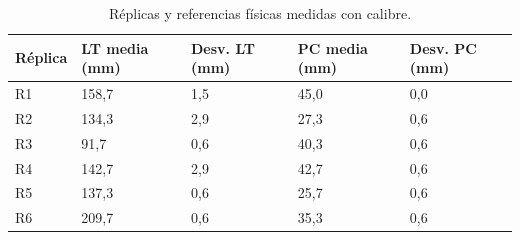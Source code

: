 
\begin{table}[htbp]
\centering\footnotesize
\caption{Réplicas y referencias físicas medidas con calibre.}
\label{tab:replicas}
\begin{tabular}{@{}lp{1.6cm}p{1.5cm}p{1.6cm}p{1.5cm}@{}}
\toprule
Réplica & LT media (mm) & Desv. LT (mm) & PC media (mm) & Desv. PC (mm) \\
\midrule
R1 & 158,7 & 1,5 & 45,0 & 0,0 \\
R2 & 134,3 & 2,9 & 27,3 & 0,6 \\
R3 & 91,7 & 0,6 & 40,3 & 0,6 \\
R4 & 142,7 & 2,9 & 42,7 & 0,6 \\
R5 & 137,3 & 0,6 & 25,7 & 0,6 \\
R6 & 209,7 & 0,6 & 35,3 & 0,6 \\
\bottomrule
\end{tabular}
\end{table}

